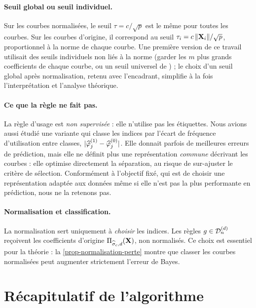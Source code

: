 \paragraph{Seuil global ou seuil individuel.} Sur les courbes normalisées, le seuil $\tau=c/\sqrt p$ est le même pour toutes les courbes. Sur les courbes d'origine, il correspond au seuil $\tau_i=c\,\|\mathbf{X}_i\|/\sqrt p$, proportionnel à la norme de chaque courbe. Une première version de ce travail utilisait des seuils individuels non liés à la norme (garder les $m$ plus grands coefficients de chaque courbe, ou un seuil universel de \citealt{donoho1994ideal}) ; le choix d'un seuil global après normalisation, retenu avec l'encadrant, simplifie à la fois l'interprétation et l'analyse théorique.

\paragraph{Ce que la règle ne fait pas.} La règle d'usage est \emph{non supervisée} : elle n'utilise pas les étiquettes. Nous avions aussi étudié une variante qui classe les indices par l'écart de fréquence d'utilisation entre classes, $|\widehat{\varphi}^{(1)}_j-\widehat{\varphi}^{(0)}_j|$. Elle donnait parfois de meilleures erreurs de prédiction, mais elle ne définit plus une représentation \emph{commune} décrivant les courbes : elle optimise directement la séparation, au risque de sur-ajuster le critère de sélection. Conformément à l'objectif fixé, qui est de choisir une représentation adaptée aux données même si elle n'est pas la plus performante en prédiction, nous ne la retenons pas.

\paragraph{Normalisation et classification.} La normalisation sert uniquement à \emph{choisir} les indices. Les règles $g\in\mathcal{D}_n^{(d)}$ reçoivent les coefficients d'origine $\Pi_{\widehat{\sigma}_c,d}(\mathbf{X})$, non normalisés. Ce choix est essentiel pour la théorie : la \cref{prop-normalisation-perte} montre que classer les courbes normalisées peut augmenter strictement l'erreur de Bayes.

\section{Récapitulatif de l'algorithme}

